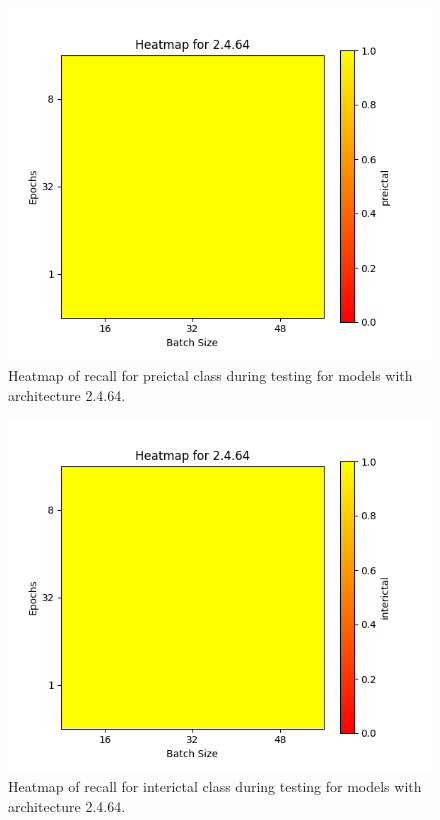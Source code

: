 \documentclass[12pt]{article}
\begin{document}
\begin{figure}[H]
\includegraphics[width=\textwidth]{heatmap_recall_preictal_2.4.64}
\centering
\caption{Heatmap of recall for preictal class during testing for models with architecture 2.4.64.}
\label{fig:time-metrics}
\end{figure}

\begin{figure}[H]
\includegraphics[width=\textwidth]{heatmap_recall_interictal_2.4.64}
\centering
\caption{Heatmap of recall for interictal class during testing for models with architecture 2.4.64.}
\label{fig:time-metrics}
\end{figure}
\end{document}
